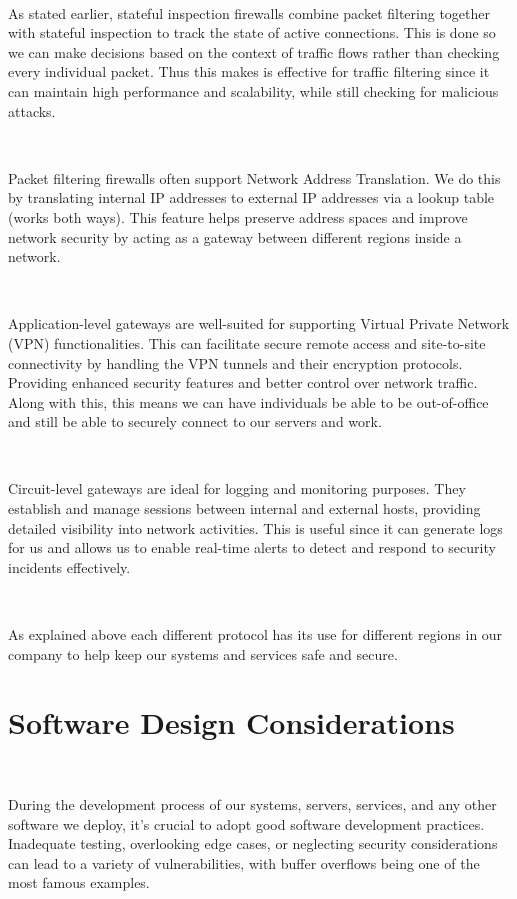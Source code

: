 \documentclass[12pt,a4paper]{report}
\begin{document}
\

As stated earlier, stateful inspection firewalls combine packet filtering together with stateful inspection to track the state of active connections.
This is done so we can make decisions based on the context of traffic flows rather than checking every individual packet. 
Thus this makes is effective for traffic filtering since it can maintain high performance and scalability, while still checking for malicious attacks.

\

Packet filtering firewalls often support Network Address Translation.
We do this by translating internal IP addresses to external IP addresses via a lookup table (works both ways). 
This feature helps preserve address spaces and improve network security by acting as a gateway between different regions inside a network.

\

Application-level gateways are well-suited for supporting Virtual Private Network (VPN) functionalities. 
This can facilitate secure remote access and site-to-site connectivity by handling the VPN tunnels and their encryption protocols.
Providing enhanced security features and better control over network traffic.
Along with this, this means we can have individuals be able to be out-of-office and still be able to securely connect to our servers and work.

\

Circuit-level gateways are ideal for logging and monitoring purposes. 
They establish and manage sessions between internal and external hosts, providing detailed visibility into network activities.
This is useful since it can generate logs for us and allows us to enable real-time alerts to detect and respond to security incidents effectively.

\

As explained above each different protocol has its use for different regions in our company to help keep our systems and services safe and secure.

\section{Software Design Considerations}
\

During the development process of our systems, servers, services, and any other software we deploy, it's crucial to adopt good software development practices. 
Inadequate testing, overlooking edge cases, or neglecting security considerations can lead to a variety of vulnerabilities, with buffer overflows being one of the most famous examples.
\end{document}
